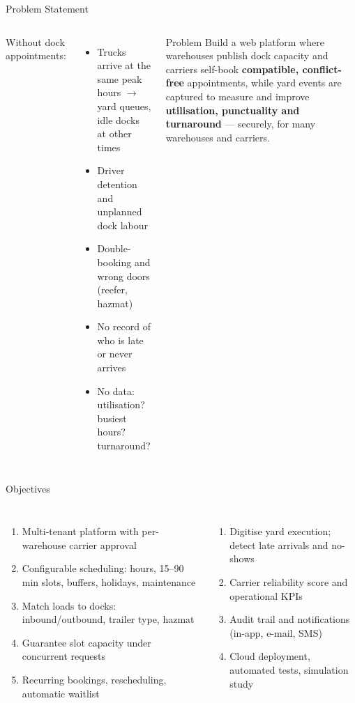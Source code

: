 \documentclass[aspectratio=169,11pt]{beamer}
\begin{document}
\begin{frame}{Problem Statement}
\begin{columns}[T]
Without dock appointments:
\begin{itemize}
  \item Trucks arrive at the same \alert{peak hours} $\rightarrow$ yard queues, idle docks at other times
  \item Driver \alert{detention} and unplanned dock labour
  \item \alert{Double-booking} and wrong doors (reefer, hazmat)
  \item No record of who is late or never arrives
  \item No data: utilisation? busiest hours? turnaround?
\end{itemize}
\begin{block}{Problem}
\small Build a web platform where warehouses publish dock capacity and carriers self-book \textbf{compatible, conflict-free} appointments, while yard events are captured to measure and improve \textbf{utilisation, punctuality and turnaround} --- securely, for many warehouses and carriers.
\end{block}
\end{columns}
\end{frame}

\begin{frame}{Objectives}
\begin{columns}[T]
\begin{enumerate}\small
  \item Multi-tenant platform with per-warehouse carrier approval
  \item Configurable scheduling: hours, 15--90 min slots, buffers, holidays, maintenance
  \item Match loads to docks: inbound/outbound, trailer type, hazmat
  \item \alert{Guarantee} slot capacity under concurrent requests
  \item Recurring bookings, rescheduling, automatic waitlist
\end{enumerate}
\begin{enumerate}\small\setcounter{enumi}{5}
  \item Digitise yard execution; detect late arrivals and no-shows
  \item Carrier reliability score and operational KPIs
  \item Audit trail and notifications (in-app, e-mail, SMS)
  \item Cloud deployment, automated tests, simulation study
\end{enumerate}
\end{columns}
\end{frame}
\end{document}
